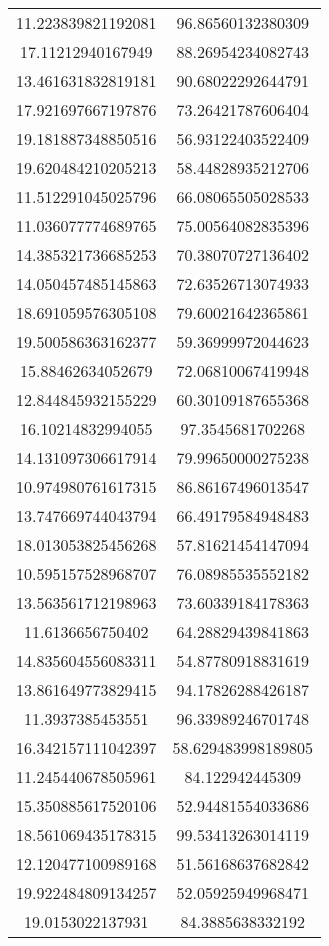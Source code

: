 \begin{table}
\begin{tabular}{cc}
11.223839821192081 & 96.86560132380309 \\
17.11212940167949 & 88.26954234082743 \\
13.461631832819181 & 90.68022292644791 \\
17.921697667197876 & 73.26421787606404 \\
19.181887348850516 & 56.93122403522409 \\
19.620484210205213 & 58.44828935212706 \\
11.512291045025796 & 66.08065505028533 \\
11.036077774689765 & 75.00564082835396 \\
14.385321736685253 & 70.38070727136402 \\
14.050457485145863 & 72.63526713074933 \\
18.691059576305108 & 79.60021642365861 \\
19.500586363162377 & 59.36999972044623 \\
15.88462634052679 & 72.06810067419948 \\
12.844845932155229 & 60.30109187655368 \\
16.10214832994055 & 97.3545681702268 \\
14.131097306617914 & 79.99650000275238 \\
10.974980761617315 & 86.86167496013547 \\
13.747669744043794 & 66.49179584948483 \\
18.013053825456268 & 57.81621454147094 \\
10.595157528968707 & 76.08985535552182 \\
13.563561712198963 & 73.60339184178363 \\
11.6136656750402 & 64.28829439841863 \\
14.835604556083311 & 54.87780918831619 \\
13.861649773829415 & 94.17826288426187 \\
11.3937385453551 & 96.33989246701748 \\
16.342157111042397 & 58.629483998189805 \\
11.245440678505961 & 84.122942445309 \\
15.350885617520106 & 52.94481554033686 \\
18.561069435178315 & 99.53413263014119 \\
12.120477100989168 & 51.56168637682842 \\
19.922484809134257 & 52.05925949968471 \\
19.0153022137931 & 84.3885638332192 \\

\end{tabular}
\end{table}
